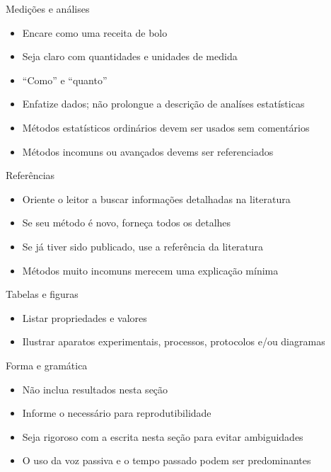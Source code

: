 \begin{frame}{Medições e análises}
\begin{itemize}
\item Encare como uma receita de bolo
\item Seja claro com quantidades e unidades de medida
\item ``Como'' e ``quanto''
\item Enfatize dados; não prolongue a descrição de analíses estatísticas
\item Métodos estatísticos ordinários devem ser usados sem comentários 
\item Métodos incomuns ou avançados devems ser referenciados 
\end{itemize}
\end{frame}

\begin{frame}{Referências}
\begin{itemize}
\item Oriente o leitor a buscar informações detalhadas na literatura
\item Se seu método é novo, forneça todos os detalhes 
\item Se já tiver sido publicado, use a referência da literatura 
\item Métodos muito incomuns merecem uma explicação mínima
\end{itemize}
\end{frame}


\begin{frame}{Tabelas e figuras}
\begin{itemize}
\item Listar propriedades e valores 
\item Ilustrar aparatos experimentais, processos, protocolos e/ou diagramas
\end{itemize}
\end{frame}


\begin{frame}{Forma e gramática}
\begin{itemize}
\item Não inclua resultados nesta seção
\item Informe o necessário para reprodutibilidade 
\item Seja rigoroso com a escrita nesta seção para evitar ambiguidades
\item O uso da voz passiva e o tempo passado podem ser predominantes
\end{itemize}
\end{frame}


